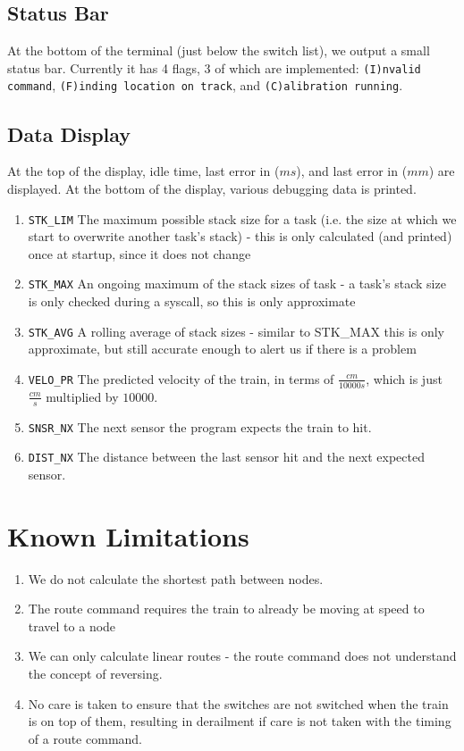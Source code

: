 \documentclass{article}
\begin{document}
\subsection{Status Bar}
At the bottom of the terminal (just below the switch list), we output a small status bar. Currently it has 4 flags, 3 of which are implemented: \verb|(I)nvalid command|, \verb|(F)inding location on track|, and \verb|(C)alibration running|.
\subsection{Data Display}
At the top of the display, idle time, last error in ($ms$), and last error in ($mm$) are displayed.
At the bottom of the display, various debugging data is printed.\\
\begin{enumerate}
    \item{\verb|STK_LIM|} The maximum possible stack size for a task (i.e. the size at which we start to overwrite another task's stack) - this is only calculated (and printed) once at startup, since it does not change
    \item{\verb|STK_MAX|} An ongoing maximum of the stack sizes of task - a task's stack size is only checked during a syscall, so this is only approximate
    \item{\verb|STK_AVG|} A rolling average of stack sizes - similar to STK\_MAX this is only approximate, but still accurate enough to alert us if there is a problem
    \item{\verb|VELO_PR|} The predicted velocity of the train, in terms of $ \frac{cm}{10000s}$, which is just $\frac{cm}{s}$ multiplied by $10000$.
    \item{\verb|SNSR_NX|} The next sensor the program expects the train to hit.
    \item{\verb|DIST_NX|} The distance between the last sensor hit and the next expected sensor.
\end{enumerate}

\section{Known Limitations}
\begin{enumerate}
\item We do not calculate the shortest path between nodes.
\item The route command requires the train to already be moving at speed to travel to a node
\item We can only calculate linear routes - the route command does not understand the concept of reversing.
\item No care is taken to ensure that the switches are not switched when the train is on top of them, resulting in derailment if care is not taken with the timing of a route command.

\end{enumerate}
\end{document}
